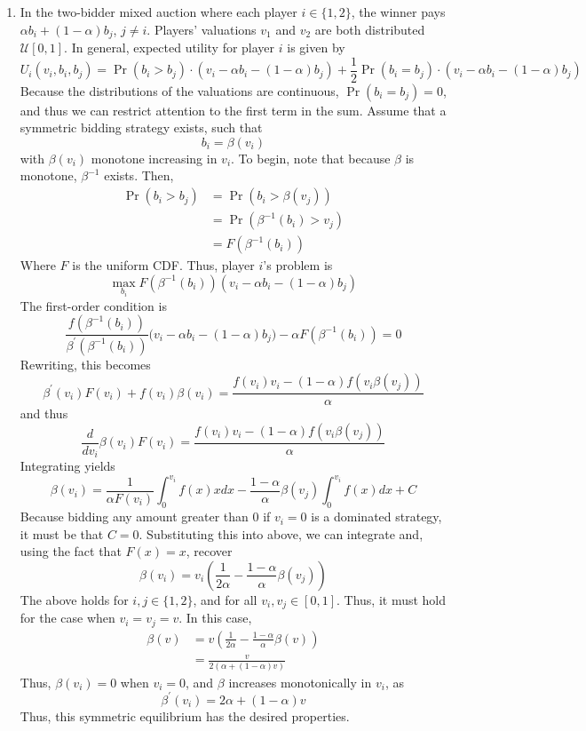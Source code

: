 \documentclass[11pt]{article}
\newcommand{\inv}[1]{#1^{-1}}
\begin{document}
\begin{enumerate}
	\item In the two-bidder mixed auction where each player $ i\in\{1,2\} $, the winner pays $ \alpha b_i + (1 - \alpha)b_{j} $, $ j\neq i $. Players' valuations $ v_1 $ and $ v_2 $ are both distributed $ \mathcal{U}[0,1] $. In general, expected utility for player $ i $ is given by 
	\[U_i(v_i, b_i, b_j) = \Pr(b_i > b_j) \cdot (v_i - \alpha b_i - (1 - \alpha) b_j ) + \frac{1}{2}\Pr(b_i = b_j)\cdot (v_i - \alpha b_i - (1 - \alpha) b_j )\]
	Because the distributions of the valuations are continuous, $ \Pr(b_i = b_j) = 0 $, and thus we can restrict attention to the first term in the sum. Assume that a symmetric bidding strategy exists, such that 
	\[b_i = \beta(v_i)\]
	with $ \beta(v_i) $ monotone increasing in $ v_i $. To begin, note that because $ \beta $ is monotone, $ \inv{\beta} $ exists. Then, 
	\begin{align*}
	\Pr(b_i > b_j) &= \Pr(b_i > \beta(v_j)) \\ &= \Pr(\inv{\beta}(b_i) > v_j) \\ &= F(\inv{\beta}(b_i))
	\end{align*}
	Where $ F $ is the uniform CDF. Thus, player $ i $'s problem is
	\[\max_{b_i} F(\inv{\beta}(b_i))(v_i - \alpha b_i - (1 - \alpha)b_j)\]
	The first-order condition is 
	\[\frac{f(\inv{\beta}(b_i))}{\beta^\prime (\inv{\beta}(b_i))} \big(v_i - \alpha b_i - (1  - \alpha)b_j\big) - \alpha F(\inv{\beta}(b_i)) = 0 \]
	Rewriting, this becomes
	\[\beta^\prime (v_i) F(v_i) + f(v_i)\beta(v_i) = \frac{f(v_i) v_i - (1 - \alpha)f(v_i \beta(v_j))}{\alpha} \]
	and thus
	\[\frac{d}{d v_i} \beta(v_i)F(v_i) = \frac{f(v_i) v_i - (1 - \alpha)f(v_i \beta(v_j))}{\alpha} \]
	Integrating yields 
	\[\beta(v_i) = \frac{1}{\alpha F(v_i)} \int_{0}^{v_i}f(x)x dx - \frac{1 - \alpha}{\alpha}\beta(v_j)\int_{0}^{v_i}f(x) dx + C\]
	Because bidding any amount greater than 0 if $ v_i = 0 $ is a dominated strategy, it must be that $ C = 0 $. Substituting this into above, we can integrate and, using the fact that $ F(x) = x $, recover
	\[\beta(v_i) = v_i \left(\frac{1}{2\alpha} - \frac{1 - \alpha}{\alpha}\beta(v_j)\right)\]
	The above holds for $ i,j\in\{1,2\} $, and for all $ v_i, v_j\in[0,1] $. Thus, it must hold for the case when $ v_i = v_j = v $. In this case, 
	\begin{align*}
	\beta(v) &= v \left(\frac{1}{2\alpha} - \frac{1 - \alpha}{\alpha}\beta(v)\right) \\
	&= \frac{v}{2(\alpha + (1 - \alpha) v)}
	\end{align*}
	Thus, $ \beta(v_i) = 0 $ when $ v_i = 0 $, and $ \beta $ increases monotonically in $ v_i $, as 
	\[\beta^\prime (v_i) = 2\alpha + (1 - \alpha)v\]
	Thus, this symmetric equilibrium has the desired properties. 
	

\end{enumerate}
\end{document}
